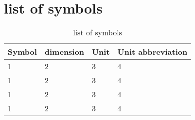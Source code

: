 \section*{list of symbols} \label{section: symbols}

\begin{table}[ht]
    \centering
    \caption{list of symbols}
    \begin{tabular}[t]
        {m{}m{}m{}m{}}
        \toprule
        \textbf{Symbol} & \textbf{dimension} & \textbf{Unit} & \textbf{Unit abbreviation} \\
        \midrule
        1               & 2                  & 3             & 4                          \\
        1               & 2                  & 3             & 4                          \\
        1               & 2                  & 3             & 4                          \\
        1               & 2                  & 3             & 4                          \\
        \bottomrule
    \end{tabular}
\end{table}